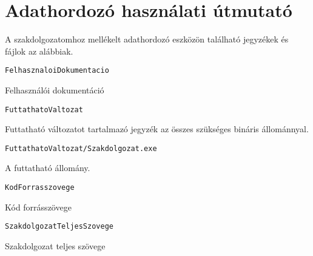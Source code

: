 \chapter*{Adathordozó használati útmutató}



\noindent A szakdolgozatomhoz mellékelt adathordozó eszközön található jegyzékek és fájlok az alábbiak.

\bigskip

\noindent \texttt{FelhasznaloiDokumentacio}

\medskip

Felhasználói dokumentáció

\bigskip

\noindent \texttt{FuttathatoValtozat}

\medskip

Futtatható változatot tartalmazó jegyzék az összes szükséges bináris állománnyal.

\bigskip

\noindent \texttt{FuttathatoValtozat/Szakdolgozat.exe}

\medskip

A futtatható állomány.

\bigskip

\noindent \texttt{KodForrasszovege}

\medskip

Kód forrásszövege

\bigskip

\noindent \texttt{SzakdolgozatTeljesSzovege}

\medskip

Szakdolgozat teljes szövege

